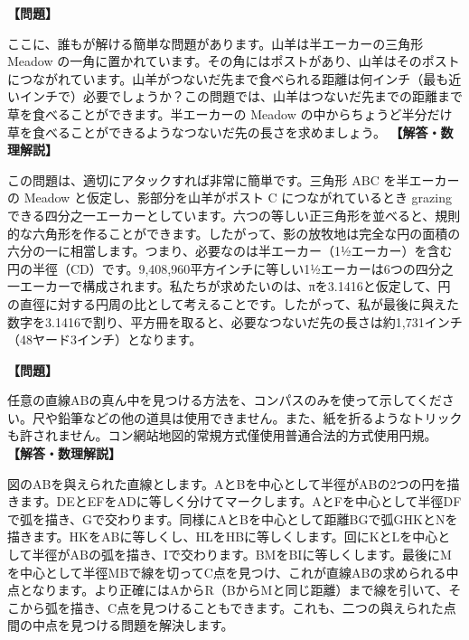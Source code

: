 \documentclass[10pt,a4paper,oneside,openany]{ltjsbook}
\begin{document}
\begin{tcolorbox}[colback=softblue,colframe=primaryblue,title=\textbf{第 196 問：縄に繋がれた山羊 （原題: THE TETHERED GOAT.）},arc=2mm,boxrule=1pt,breakable]
\textbf{【問題】}\par\vspace{0.3em}
ここに、誰もが解ける簡単な問題があります。山羊は半エーカーの三角形 Meadow の一角に置かれています。その角にはポストがあり、山羊はそのポストにつながれています。山羊がつないだ先まで食べられる距離は何インチ（最も近いインチで）必要でしょうか？この問題では、山羊はつないだ先までの距離まで草を食べることができます。半エーカーの Meadow の中からちょうど半分だけ草を食べることができるようなつないだ先の長さを求めましょう。
\tcblower
\textbf{【解答・数理解説】}\par\vspace{0.3em}
この問題は、適切にアタックすれば非常に簡単です。三角形 ABC を半エーカーの Meadow と仮定し、影部分を山羊がポスト C につながれているとき grazing できる四分之一エーカーとしています。六つの等しい正三角形を並べると、規則的な六角形を作ることができます。したがって、影の放牧地は完全な円の面積の六分の一に相當します。つまり、必要なのは半エーカー（1½エーカー）を含む円の半徑（CD）です。9,408,960平方インチに等しい1½エーカーは6つの四分之一エーカーで構成されます。私たちが求めたいのは、πを3.1416と仮定して、円の直徑に対する円周の比として考えることです。したがって、私が最後に與えた数字を3.1416で割り、平方冊を取ると、必要なつないだ先の長さは約1,731インチ（48ヤード3インチ）となります。
\end{tcolorbox}

\begin{tcolorbox}[colback=softblue,colframe=primaryblue,title=\textbf{第 197 問：コンパスによる直線の中点探求 （原題: THE COMPASSES PUZZLE.）},arc=2mm,boxrule=1pt,breakable]
\textbf{【問題】}\par\vspace{0.3em}
任意の直線ABの真ん中を見つける方法を、コンパスのみを使って示してください。尺や鉛筆などの他の道具は使用できません。また、紙を折るようなトリックも許されません。コン網站地図的常規方式僅使用普通合法的方式使用円規。
\tcblower
\textbf{【解答・数理解説】}\par\vspace{0.3em}
図のABを與えられた直線とします。AとBを中心として半徑がABの2つの円を描きます。DEとEFをADに等しく分けてマークします。AとFを中心として半徑DFで弧を描き、Gで交わります。同様にAとBを中心として距離BGで弧GHKとNを描きます。HKをABに等しくし、HLをHBに等しくします。回にKとLを中心として半徑がABの弧を描き、Iで交わります。BMをBIに等しくします。最後にMを中心として半徑MBで線を切ってC点を見つけ、これが直線ABの求められる中点となります。より正確にはAからR（BからMと同じ距離）まで線を引いて、そこから弧を描き、C点を見つけることもできます。これも、二つの與えられた点間の中点を見つける問題を解決します。
\end{tcolorbox}
\end{document}
